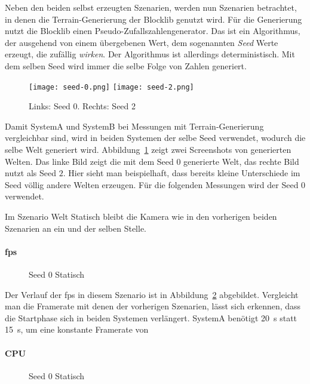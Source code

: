 Neben den beiden selbst erzeugten Szenarien, werden nun Szenarien betrachtet, in denen die Terrain-Generierung der Blocklib genutzt wird. Für die Generierung nutzt die Blocklib einen Pseudo-Zufallszahlengenerator. Das ist ein Algorithmus, der ausgehend von einem übergebenen Wert, dem sogenannten \emph{Seed} Werte erzeugt, die zufällig \emph{wirken}. Der Algorithmus ist allerdings deterministisch. Mit dem selben Seed wird immer die selbe Folge von Zahlen generiert.

\begin{figure}
	\centering
	\texttt{[image: seed-0.png]}
	\hfill
	\texttt{[image: seed-2.png]}
	\caption{Links: Seed 0. Rechts: Seed 2}\label{fig:static}
\end{figure}
Damit SystemA und SystemB bei Messungen mit Terrain-Generierung vergleichbar sind, wird in beiden Systemen der selbe Seed verwendet, wodurch die selbe Welt generiert wird. Abbildung~\ref{fig:static} zeigt zwei Screenshots von generierten Welten. Das linke Bild zeigt die mit dem Seed $0$ generierte Welt, das rechte Bild nutzt als Seed $2$. Hier sieht man beispielhaft, dass bereits kleine Unterschiede im Seed völlig andere Welten erzeugen. Für die folgenden Messungen wird der Seed $0$ verwendet. 

Im Szenario Welt Statisch bleibt die Kamera wie in den vorherigen beiden Szenarien an ein und der selben Stelle.



\paragraph{\ac{fps}}
\begin{figure}[!htbp]
	\caption{Seed 0 Statisch}\label{fig:seed-0-static-fps}
\end{figure}
Der Verlauf der \ac{fps} in diesem Szenario ist in Abbildung~\ref{fig:seed-0-static-fps} abgebildet. Vergleicht man die Framerate mit denen der vorherigen Szenarien, lässt sich erkennen, dass die Startphase sich in beiden Systemen verlängert. SystemA benötigt \SI{20}{\second} statt \SI{15}{\second}, um eine konstante Framerate von \SI{}{}

\paragraph{CPU}
\begin{figure}[!htbp]
	\caption{Seed 0 Statisch}\label{fig:seed-0-static-cpu}
\end{figure}

